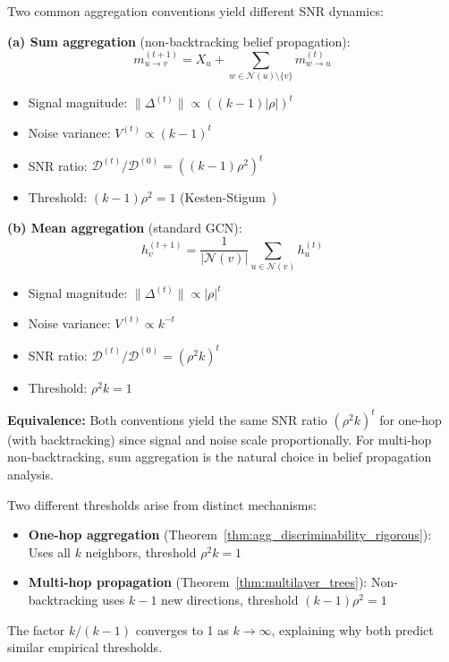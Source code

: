 \begin{corollary}
\label{cor:sum_vs_mean}
Two common aggregation conventions yield different SNR dynamics:

\textbf{(a) Sum aggregation} (non-backtracking belief propagation):
\begin{equation}
    m_{u \to v}^{(t+1)} = X_u + \sum_{w \in \mathcal{N}(u) \setminus \{v\}} m_{w \to u}^{(t)}
\end{equation}
\begin{itemize}
    \item Signal magnitude: $\|\Delta^{(t)}\| \propto ((k-1)|\rho|)^t$
    \item Noise variance: $V^{(t)} \propto (k-1)^t$
    \item SNR ratio: $\mathcal{D}^{(t)}/\mathcal{D}^{(0)} = ((k-1)\rho^2)^t$
    \item Threshold: $(k-1)\rho^2 = 1$ (Kesten-Stigum~\cite{kesten1966additional})
\end{itemize}

\textbf{(b) Mean aggregation} (standard GCN):
\begin{equation}
    h_v^{(t+1)} = \frac{1}{|\mathcal{N}(v)|} \sum_{u \in \mathcal{N}(v)} h_u^{(t)}
\end{equation}
\begin{itemize}
    \item Signal magnitude: $\|\Delta^{(t)}\| \propto |\rho|^t$
    \item Noise variance: $V^{(t)} \propto k^{-t}$
    \item SNR ratio: $\mathcal{D}^{(t)}/\mathcal{D}^{(0)} = (\rho^2 k)^t$
    \item Threshold: $\rho^2 k = 1$
\end{itemize}

\textbf{Equivalence:} Both conventions yield the same SNR ratio $(\rho^2 k)^t$ for one-hop (with backtracking) since signal and noise scale proportionally. For multi-hop non-backtracking, sum aggregation is the natural choice in belief propagation analysis.
\end{corollary}

\begin{remark}
\label{rem:k_vs_k_minus_1_rigorous}
Two different thresholds arise from distinct mechanisms:
\begin{itemize}
    \item \textbf{One-hop aggregation} (Theorem~\ref{thm:agg_discriminability_rigorous}): Uses all $k$ neighbors, threshold $\rho^2 k = 1$
    \item \textbf{Multi-hop propagation} (Theorem~\ref{thm:multilayer_trees}): Non-backtracking uses $k-1$ new directions, threshold $(k-1)\rho^2 = 1$
\end{itemize}
The factor $k/(k-1)$ converges to 1 as $k \to \infty$, explaining why both predict similar empirical thresholds.
\end{remark}

